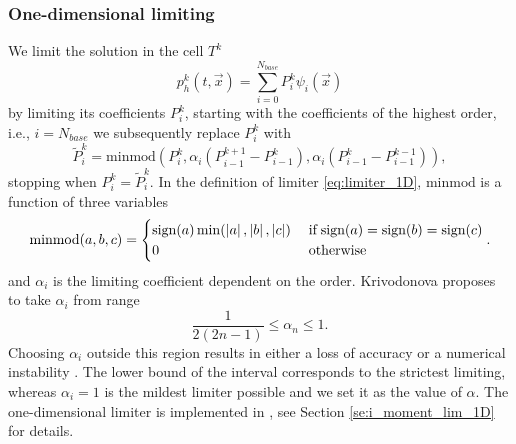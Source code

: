 \subsubsection{One-dimensional limiting}
\label{sse:moment_lim_1D}
We limit the solution in the cell $T^k$
\begin{equation}
\label{eq:el_lin_comb_lim}
p_h^k(t, \vec{x}) = \sum\limits_{i=0}^{N_{base}} P_i^k\psi_i(\vec{x})
\end{equation}
by limiting its coefficients $P_i^k$, starting with the coefficients of the
highest order, i.e., $i = N_{base}$ we subsequently replace
$P_i^k$ with
\begin{equation}
\label{eq:limiter_1D}
\tilde{P}_i^k = \text{minmod}\left(P_i^k,
\alpha_i(P_{i-1}^{k+1} - P_{i-1}^k),
\alpha_i (P_{i-1}^k - P_{i-1}^{k-1})\right),
\end{equation}
stopping when $P_i^k = \tilde{P}_i^k$. In the definition of limiter \eqref{eq:limiter_1D},
$\text{minmod}$ is a function of three
variables
\begin{equation}
\text{minmod}(a,b,c) =
\begin{cases}
\text{sign}(a)\min(\left\lvert a\right\rvert, \left\lvert b\right\rvert, \left\lvert c\right\rvert) & \;\text{if}\;
\text{sign}(a) =
\text{sign}(b) =
\text{sign}(c)\\
0 & \;\text{otherwise}
\end{cases}.
\end{equation}
and $\alpha_i$ is the limiting coefficient dependent on the order. Krivodonova
\cite{Krivodonova2007} proposes to take $\alpha_i$ from range
\begin{equation}
\frac{1}{2(2n -1)} \leq \alpha_n \leq 1.
\end{equation}
Choosing $\alpha_i$ outside this region results in either a loss of accuracy or
a numerical
instability \cite[p. 882]{Krivodonova2007}. The lower bound of the interval corresponds to
the strictest limiting, whereas $\alpha_i = 1$ is the mildest limiter possible \cite[p.
882]{Krivodonova2007} and we set it as the value of $\alpha$. The one-dimensional limiter 
is implemented in , see Section 
\ref{se:i_moment_lim_1D} for details.

